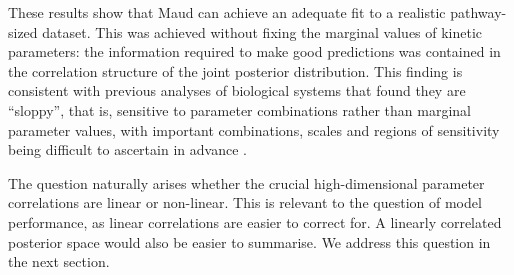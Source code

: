 \documentclass[journal=asbcd6,manuscript=article,layout=traditional]{achemso}
\begin{document}
These results show that Maud can achieve an adequate fit to a realistic
pathway-sized dataset. This was achieved without fixing the marginal
values of kinetic parameters: the information required to make good
predictions was contained in the correlation structure of the joint
posterior distribution. This finding is consistent with previous
analyses of biological systems that found they are ``sloppy'', that is,
sensitive to parameter combinations rather than marginal parameter
values, with important combinations, scales and regions of sensitivity
being difficult to ascertain in advance
\citep{gutenkunst_2007, poirier_revising_1998}.

The question naturally arises whether the crucial high-dimensional
parameter correlations are linear or non-linear. This is relevant to the
question of model performance, as linear correlations are easier to
correct for. A linearly correlated posterior space would also be easier
to summarise. We address this question in the next section.
\end{document}
